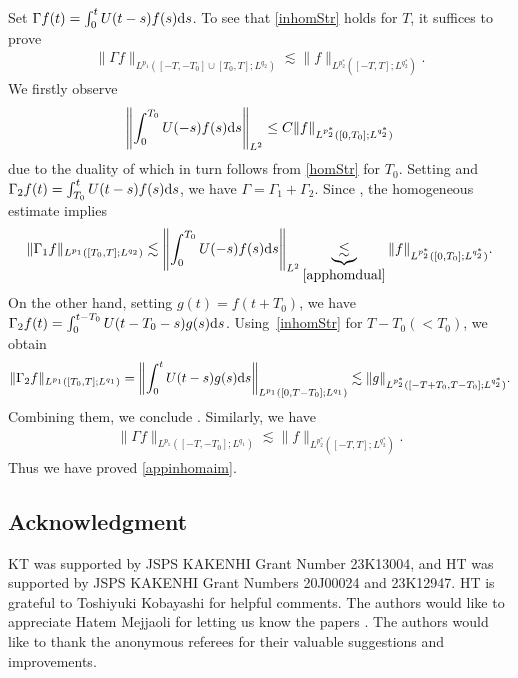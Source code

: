 \documentclass[pdftex]{sigma}
\numberwithin{equation}{section}
\begin{document}
Set $\Gamma f(t)=\int_0^tU(t-s)f(s){\rm d}s$.
To see that \eqref{inhomStr} holds for $T$, it suffices to prove
\begin{align}\label{appinhomaim}
\|\Gamma f\|_{L^{p_1}([-T,-T_0]\cup [T_0,T];L^{q_2})}\lesssim \|f\|_{L^{p_2^*}([-T,T];L^{q_2^*})}.
\end{align}
We firstly observe
\begin{align}\label{apphomdual}
\left\|\int_0^{T_0}U(-s)f(s){\rm d}s \right\|_{L^2}\leq C\|f\|_{L^{p_2^*}([0,T_0];L^{q_2^*})}
\end{align}
due to the duality of  which in turn follows from \eqref{homStr} for $T_0$. Setting  and $\Gamma_2f(t)=\int_{T_0}^tU(t-s)f(s){\rm d}s$, we have $\Gamma=\Gamma_1+\Gamma_2$. Since , the homogeneous estimate  implies
\begin{align*}
\|\Gamma_1 f\|_{L^{p_1}([T_0,T];L^{q_2})}\lesssim\left\|\int_0^{T_0}U(-s)f(s){\rm d}s \right\|_{L^2}\underbrace{\lesssim}_{\eqref{apphomdual}} \|f\|_{L^{p_2^*}([0,T_0];L^{q_2^*})}.
\end{align*}
On the other hand, setting $g(t)=f(t+T_0)$, we have $\Gamma_2f(t)=\int_0^{t-T_0}U(t-T_0-s)g(s){\rm d}s$. Using~\eqref{inhomStr} for $T-T_0(<T_0)$, we obtain
\begin{align*}
\|\Gamma_2f\|_{L^{p_1}([T_0,T];L^{q_1})}=\left\|\int_0^{t}U(t-s)g(s){\rm d}s\right\|_{L^{p_1}([0,T-T_0];L^{q_1})}\lesssim \|g\|_{L^{p_2^*}([-T+T_0,T-T_0];L^{q_2^*})}.
\end{align*}
Combining them, we conclude . Similarly, we have
\begin{align*}
\|\Gamma f\|_{L^{p_1}([-T,-T_0];L^{q_1})}\lesssim \|f\|_{L^{p_2^*}([-T,T];L^{q_2^*})}.
\end{align*}
Thus we have proved \eqref{appinhomaim}.

\subsection*{Acknowledgment}
KT was supported by JSPS KAKENHI Grant Number 23K13004, and HT was supported by JSPS KAKENHI Grant Numbers 20J00024 and 23K12947. HT is grateful to Toshiyuki Kobayashi for helpful comments. The authors would like to appreciate Hatem Mejjaoli for letting us know the papers \cite{BMMS,M}. The authors would like to thank the anonymous referees for their valuable suggestions and improvements.
\end{document}

